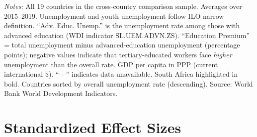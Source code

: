 \documentclass[12pt]{article}
\begin{document}
\begin{table}[H]
\begin{threeparttable}
\begin{tablenotes}[flushleft]
\small
\item \textit{Notes:} All 19 countries in the cross-country comparison sample. Averages over 2015--2019. Unemployment and youth unemployment follow ILO narrow definition. ``Adv. Educ. Unemp.'' is the unemployment rate among those with advanced education (WDI indicator SL.UEM.ADVN.ZS). ``Education Premium'' = total unemployment minus advanced-education unemployment (percentage points); negative values indicate that tertiary-educated workers face \emph{higher} unemployment than the overall rate. GDP per capita in PPP (current international \$). ``---'' indicates data unavailable. South Africa highlighted in bold. Countries sorted by overall unemployment rate (descending). Source: World Bank World Development Indicators.
\end{tablenotes}
\end{threeparttable}
\end{table}


\section{Standardized Effect Sizes}
\label{sec:sde}
\end{document}
